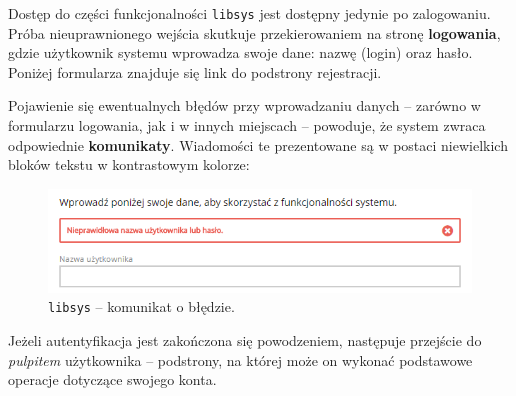 \documentclass[12pt, a4paper]{article}
\begin{document}
Dostęp do części funkcjonalności \texttt{libsys} jest dostępny jedynie po zalogowaniu. Próba nieuprawnionego wejścia skutkuje przekierowaniem na stronę \textbf{logowania}, gdzie użytkownik systemu wprowadza swoje dane: nazwę (login) oraz hasło. Poniżej formularza znajduje się link do podstrony rejestracji.

Pojawienie się ewentualnych błędów przy wprowadzaniu danych -- zarówno w formularzu logowania, jak i w innych miejscach -- powoduje, że system zwraca odpowiednie \textbf{komunikaty}. Wiadomości te prezentowane są w postaci niewielkich bloków tekstu w kontrastowym kolorze:

\begin{figure}[h]
    \centering
    \includegraphics[width=\textwidth]{img/libsys_account_4.png}
    \caption{\texttt{libsys} -- komunikat o błędzie.}
\end{figure}

Jeżeli autentyfikacja jest zakończona się powodzeniem, następuje przejście do \textit{pulpitem} użytkownika -- podstrony, na której może on wykonać podstawowe operacje dotyczące swojego konta. 
\end{document}
